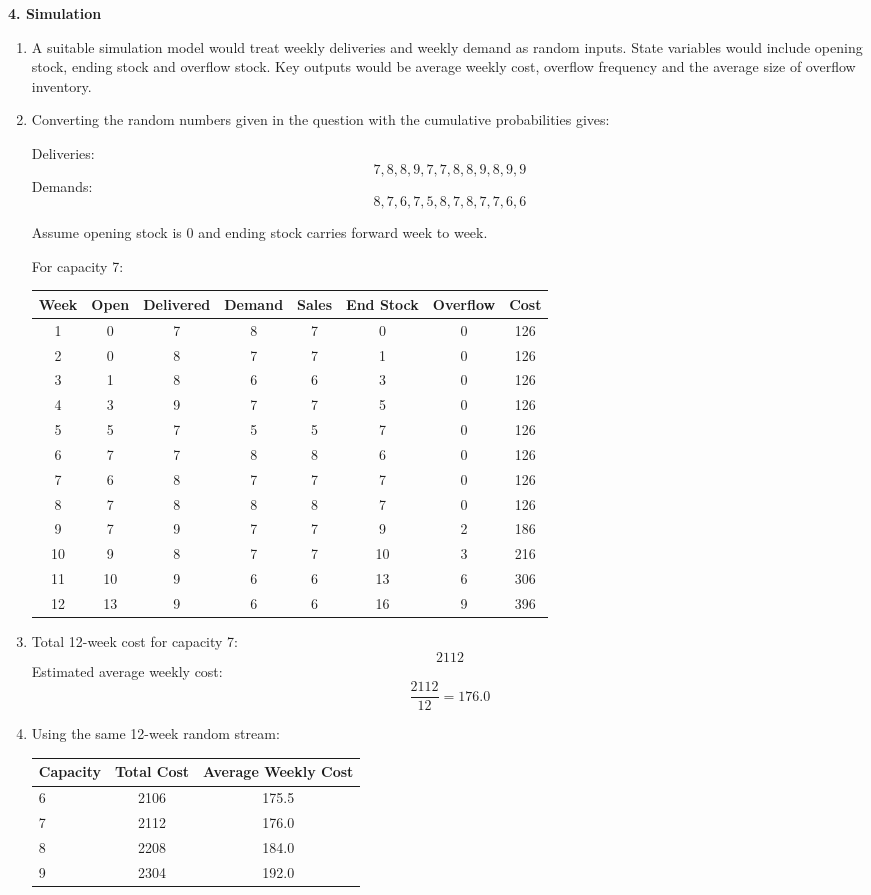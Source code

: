 \documentclass[11pt,a4paper]{article}
\begin{document}
\textbf{4. Simulation}

\begin{enumerate}
\item A suitable simulation model would treat weekly deliveries and weekly demand as random inputs. State variables would include opening stock, ending stock and overflow stock. Key outputs would be average weekly cost, overflow frequency and the average size of overflow inventory.

\item Converting the random numbers given in the question with the cumulative probabilities gives:

Deliveries:
\[
7,8,8,9,7,7,8,8,9,8,9,9
\]
Demands:
\[
8,7,6,7,5,8,7,8,7,7,6,6
\]

Assume opening stock is 0 and ending stock carries forward week to week.

For capacity 7:

\begin{center}
\begin{tabular}{cccccccc}
\toprule
Week & Open & Delivered & Demand & Sales & End Stock & Overflow & Cost \\
\midrule
1 & 0 & 7 & 8 & 7 & 0 & 0 & 126 \\
2 & 0 & 8 & 7 & 7 & 1 & 0 & 126 \\
3 & 1 & 8 & 6 & 6 & 3 & 0 & 126 \\
4 & 3 & 9 & 7 & 7 & 5 & 0 & 126 \\
5 & 5 & 7 & 5 & 5 & 7 & 0 & 126 \\
6 & 7 & 7 & 8 & 8 & 6 & 0 & 126 \\
7 & 6 & 8 & 7 & 7 & 7 & 0 & 126 \\
8 & 7 & 8 & 8 & 8 & 7 & 0 & 126 \\
9 & 7 & 9 & 7 & 7 & 9 & 2 & 186 \\
10 & 9 & 8 & 7 & 7 & 10 & 3 & 216 \\
11 & 10 & 9 & 6 & 6 & 13 & 6 & 306 \\
12 & 13 & 9 & 6 & 6 & 16 & 9 & 396 \\
\bottomrule
\end{tabular}
\end{center}

\item Total 12-week cost for capacity 7:
\[
2112
\]
Estimated average weekly cost:
\[
\frac{2112}{12}=176.0
\]

\item Using the same 12-week random stream:

\begin{center}
\begin{tabular}{lcc}
\toprule
Capacity & Total Cost & Average Weekly Cost \\
\midrule
6 & 2106 & 175.5 \\
7 & 2112 & 176.0 \\
8 & 2208 & 184.0 \\
9 & 2304 & 192.0 \\
\bottomrule
\end{tabular}
\end{center}


\end{enumerate}
\end{document}
